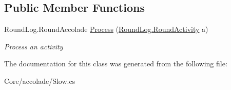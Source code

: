 \subsection*{Public Member Functions}
\begin{DoxyCompactItemize}
\item 
\hypertarget{class_m_b_c_1_1_core_1_1mbc_1_1accolade_1_1_slow_a5849f255e32663d6f88d804bffc7b1fb}{Round\-Log.\-Round\-Accolade \hyperlink{class_m_b_c_1_1_core_1_1mbc_1_1accolade_1_1_slow_a5849f255e32663d6f88d804bffc7b1fb}{Process} (\hyperlink{class_m_b_c_1_1_core_1_1_round_log_1_1_round_activity}{Round\-Log.\-Round\-Activity} a)}\label{class_m_b_c_1_1_core_1_1mbc_1_1accolade_1_1_slow_a5849f255e32663d6f88d804bffc7b1fb}

\begin{DoxyCompactList}\small\item\em Process an activity\end{DoxyCompactList}\end{DoxyCompactItemize}


The documentation for this class was generated from the following file\-:\begin{DoxyCompactItemize}
\item 
Core/accolade/Slow.\-cs\end{DoxyCompactItemize}
